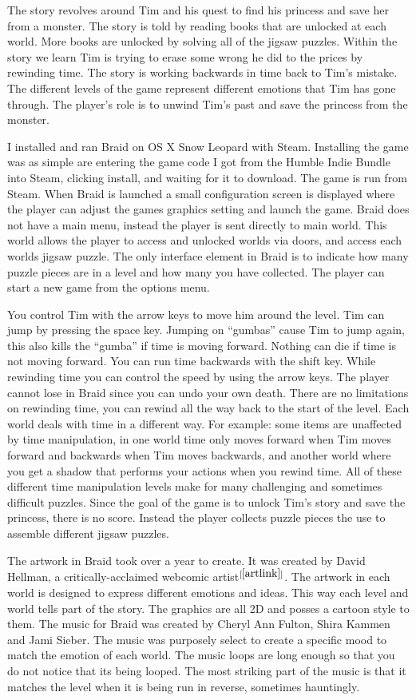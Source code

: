 \documentclass[a4paper,12pt]{report}
\begin{document}
The story revolves around Tim and his quest to find his princess and save her
from a monster.  The story is told by reading books that are unlocked at each
world.  More books are unlocked by solving all of the jigsaw puzzles.  Within
the story we learn Tim is trying to erase some wrong he did to the prices by
rewinding time.  The story is working backwards in time back to Tim's mistake.
The different levels of the game represent different emotions that Tim has gone
through.  The player's role is to unwind Tim's past and save the princess from
the monster.

I installed and ran Braid on OS X Snow Leopard with Steam.  Installing the game
was as simple are entering the game code I got from the Humble Indie Bundle into
Steam, clicking install, and waiting for it to download.  The game is run from
Steam.  When Braid is launched a small configuration screen is displayed where
the player can adjust the games graphics setting and launch the game.  Braid
does not have a main menu, instead the player is sent directly to main world.
This world allows the player to access and unlocked worlds via doors, and access
each worlds jigsaw puzzle.  The only interface element in Braid is to indicate
how many puzzle pieces are in a level and how many you have collected.  The
player can start a new game from the options menu.

You control Tim with the arrow keys to move him around the level.  Tim can jump
by pressing the space key.  Jumping on ``gumbas'' cause Tim to jump again, this
also kills the ``gumba'' if time is moving forward.  Nothing can die if time is
not moving forward.  You can run time backwards with the shift key.  While
rewinding time you can control the speed by using the arrow keys.  The player
cannot lose in Braid since you can undo your own death.  There are no
limitations on rewinding time, you can rewind all the way back to the start of
the level.  Each world deals with time in a different way.  For example: some
items are unaffected by time manipulation, in one world time only moves forward
when Tim moves forward and backwards when Tim moves backwards, and another world
where you get a shadow that performs your actions when you rewind time.  All of
these different time manipulation levels make for many challenging and sometimes
difficult puzzles.  Since the goal of the game is to unlock Tim's story and save
the princess, there is no score.  Instead the player collects puzzle pieces the
use to assemble different jigsaw puzzles.

The artwork in Braid took over a year to create.  It was created by David
Hellman, a critically-acclaimed webcomic artist$^{[\ref{artlink}]}$.  The
artwork in each world is designed to express different emotions and ideas.  This
way each level and world tells part of the story.  The graphics are
all 2D and posses a cartoon style to them.  The music for Braid was created by
Cheryl Ann Fulton, Shira Kammen and Jami Sieber.  The music was purposely select
to create a specific mood to match the emotion of each world.  The music loops
are long enough so that you do not notice that its being looped.  The most
striking part of the music is that it matches the level when it is being run in
reverse, sometimes hauntingly. 
\end{document}

